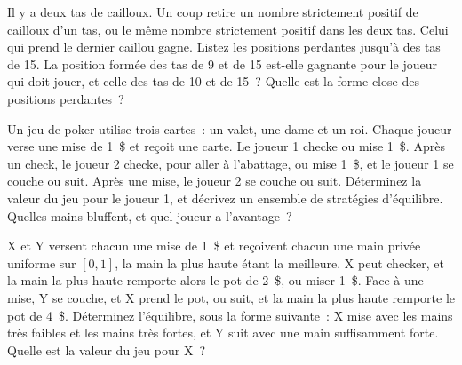 \begin{question}\label{iq:iv1:games:18}
Il y a deux tas de cailloux. Un coup retire un nombre strictement positif de cailloux d'un tas, ou le même nombre strictement positif dans les deux tas. Celui qui prend le dernier caillou gagne. Listez les positions perdantes jusqu'à des tas de 15. La position formée des tas de 9 et de 15 est-elle gagnante pour le joueur qui doit jouer, et celle des tas de 10 et de 15~? Quelle est la forme close des positions perdantes~?
\end{question}

\begin{question}\label{iq:iv1:games:19}
Un jeu de poker utilise trois cartes~: un valet, une dame et un roi. Chaque joueur verse une mise de 1~\$ et reçoit une carte. Le joueur 1 checke ou mise 1~\$. Après un check, le joueur 2 checke, pour aller à l'abattage, ou mise 1~\$, et le joueur 1 se couche ou suit. Après une mise, le joueur 2 se couche ou suit. Déterminez la valeur du jeu pour le joueur 1, et décrivez un ensemble de stratégies d'équilibre. Quelles mains bluffent, et quel joueur a l'avantage~?
\end{question}

\begin{question}\label{iq:iv1:games:20}
X et Y versent chacun une mise de 1~\$ et reçoivent chacun une main privée uniforme sur $[0, 1]$, la main la plus haute étant la meilleure. X peut checker, et la main la plus haute remporte alors le pot de 2~\$, ou miser 1~\$. Face à une mise, Y se couche, et X prend le pot, ou suit, et la main la plus haute remporte le pot de 4~\$. Déterminez l'équilibre, sous la forme suivante~: X mise avec les mains très faibles et les mains très fortes, et Y suit avec une main suffisamment forte. Quelle est la valeur du jeu pour X~?
\end{question}
